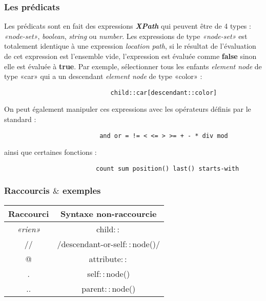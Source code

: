 \documentclass{article}
\begin{document}
\subsubsection{Les prédicats}
Les prédicats sont en fait des expressions \textbf{\textit{XPath}} qui peuvent être de 4 types : \textit{«node-set»}, \textit{boolean}, \textit{string} ou \textit{number}.  Les 
expressions de type \textit{«node-set»}  est totalement identique à une expression \textit{location path}, si le résultat de l'évaluation de cet expression est l'ensemble vide, 
l'expression est évaluée comme \textbf{false} sinon elle est évaluée à \textbf{true}. Par exemple, sélectionner tous les enfants \textit{element node} de type «car» qui a un 
descendant \textit{element node} de type «color» : 
\begin{verbatim}
                             child::car[descendant::color] 
\end{verbatim}
On peut également manipuler ces expressions avec les opérateurs définis par le standard : \begin{verbatim}
                          and or = != < <= > >= + - * div mod
\end{verbatim}
ainsi que certaines fonctions : \begin{verbatim}
                         count sum position() last() starts-with
\end{verbatim}

\subsubsection{Raccourcis $\&$ exemples}

\begin{center}
	\begin{tabular}{|*{2}{c|}}
	\hline
	Raccourci & Syntaxe non-raccourcie \\
	\hline
	\textit{«rien»} & child$::$ \\
	\hline
	// & /descendant-or-self$::$node()/ \\
	\hline
	@ & attribute$::$ \\
	\hline
	. & self$::$node() \\
	\hline
	.. & parent$::$node()\\
	\hline
	\end{tabular}
\end{center}
\end{document}

